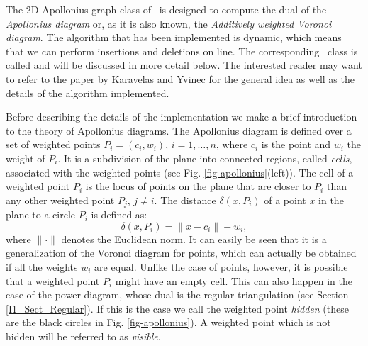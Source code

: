 The 2D Apollonius graph class of \cgal\ is designed to compute the
dual of the {\em Apollonius diagram} or, as it is also known, the
{\em Additively weighted Voronoi diagram}. The algorithm that has been
implemented is dynamic, which means that we can perform insertions and
deletions on line. The corresponding \cgal\ class is called
and will be discussed in
more detail below. The interested reader may want to refer to the
paper by Karavelas and Yvinec \cite{ky-dawvd-02} for the general idea
as well as the details of the algorithm implemented.


Before describing the details of the implementation we make a brief
introduction to the theory of Apollonius diagrams.
The Apollonius diagram is defined over a set of weighted points
$P_i=(c_i,w_i)$, $i=1,\ldots,n$, where $c_i$ is the point and $w_i$
the weight of $P_i$. It is a subdivision of the plane into connected
regions, called {\em cells}, associated with the weighted points (see
Fig. \ref{fig-apollonius}(left)). The cell of a 
weighted point $P_i$ is the locus of points on the plane that are
closer to $P_i$ than any other weighted point $P_j$, $j\ne i$.
The distance $\delta(x, P_i)$ of a point $x$ in the plane to a
circle $P_i$ is defined as: 
\[      \delta(x,P_i)=\|x-c_i\|-w_i,\]
where $\|\cdot\|$ denotes the Euclidean norm.
It can easily be seen that it is a generalization of the Voronoi
diagram for points, which can actually be obtained if all the weights
$w_i$ are equal. Unlike the case of points, however, it is
possible that a weighted point $P_i$ might have an empty cell. This
can also happen in the case of the power diagram, whose dual is the
regular triangulation (see Section \ref{I1_Sect_Regular}). If this is
the case we call the weighted point {\em hidden} (these are the black
circles in Fig. \ref{fig-apollonius}). A weighted point which is not
hidden will be referred to as {\em visible}.

